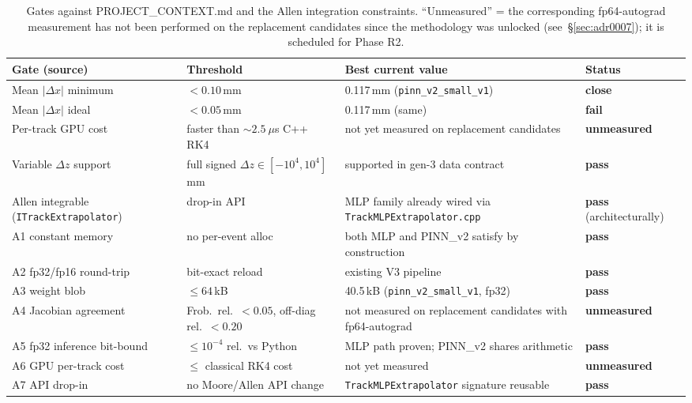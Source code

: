 \documentclass[11pt,a4paper]{article}
\begin{document}
\begin{table}[h!]
\centering
\caption{Gates against PROJECT\_CONTEXT.md and the Allen integration
constraints. ``Unmeasured'' = the corresponding fp64-autograd
measurement has not been performed on the replacement candidates
since the methodology was unlocked (see~\S\ref{sec:adr0007}); it is
scheduled for Phase R2.}
\label{tab:gates}
\small
\renewcommand{\arraystretch}{1.15}
\begin{tabularx}{\linewidth}{lYll}
\toprule
Gate (source) & Threshold & Best current value & Status \\
\midrule
Mean $|\Delta x|$ minimum~\cite{projectcontext}
   & $< 0.10$\,mm & 0.117\,mm (\texttt{pinn\_v2\_small\_v1})~\cite{gen3readme} & \textbf{close} \\
Mean $|\Delta x|$ ideal~\cite{projectcontext}
   & $< 0.05$\,mm & 0.117\,mm (same) & \textbf{fail} \\
Per-track GPU cost~\cite{projectcontext}
   & faster than $\sim 2.5~\mu$s C++ RK4 & not yet measured on replacement candidates & \textbf{unmeasured} \\
Variable $\Delta z$ support~\cite{projectcontext}
   & full signed $\Delta z \in [-10^4, 10^4]$\,mm & supported in gen-3 data contract & \textbf{pass} \\
Allen integrable (\texttt{ITrackExtrapolator})~\cite{projectcontext}
   & drop-in API & MLP family already wired via \texttt{TrackMLPExtrapolator.cpp} & \textbf{pass} (architecturally) \\
\midrule
A1 constant memory~\cite{replacementplan}
   & no per-event alloc & both MLP and PINN\_v2 satisfy by construction & \textbf{pass} \\
A2 fp32/fp16 round-trip~\cite{replacementplan}
   & bit-exact reload & existing V3 pipeline & \textbf{pass} \\
A3 weight blob~\cite{replacementplan}
   & $\le 64$\,kB & 40.5\,kB (\texttt{pinn\_v2\_small\_v1}, fp32) & \textbf{pass} \\
A4 Jacobian agreement~\cite{replacementplan, adr0007}
   & Frob.~rel.~$<\!0.05$, off-diag rel.~$<\!0.20$ & not measured on replacement candidates with fp64-autograd & \textbf{unmeasured} \\
A5 fp32 inference bit-bound~\cite{replacementplan}
   & $\le 10^{-4}$ rel.~vs Python & MLP path proven; PINN\_v2 shares arithmetic & \textbf{pass} \\
A6 GPU per-track cost~\cite{replacementplan}
   & $\le$ classical RK4 cost & not yet measured & \textbf{unmeasured} \\
A7 API drop-in~\cite{replacementplan}
   & no Moore/Allen API change & \texttt{TrackMLPExtrapolator} signature reusable & \textbf{pass} \\
\bottomrule
\end{tabularx}
\end{table}
\end{document}
